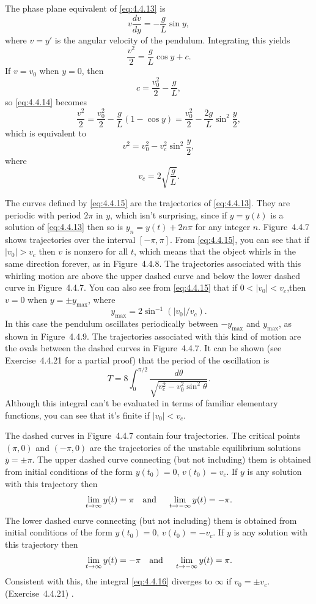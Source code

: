 \begin{example}
  The phase plane equivalent of \eqref{eq:4.4.13} is
  \[
    v\frac{dv}{dy}=-\frac{g}{L}\sin y,
  \]
  where $v=y'$ is the angular velocity of the pendulum. Integrating this yields
  \begin{equation}
    \label{eq:4.4.14}\frac{v^{2}}{2}=\frac{g}{L}\cos y+c.
  \end{equation}
  If $v=v_{0}$ when $y=0$, then
  \[
    c=\frac{v_{0}^{2}}{2}-\frac{g}{L},
  \]
  so \eqref{eq:4.4.14} becomes
  \[
    \frac{v^{2}}{2}=\frac{v_{0}^{2}}{2}-\frac{g}{L}(1-\cos y) =\frac{v_{0}^{2}}{2}-\frac{2g}{L}\sin^{2}\frac{y}{2},
  \]
  which is equivalent to
  \begin{equation}
    \label{eq:4.4.15}v^{2}=v_{0}^{2}-v_{c}^{2}\sin^{2}\frac{y}{2},
  \end{equation}
  where
  \[
    v_{c}=2\sqrt{\frac{g}{L}}.
  \]

  The curves defined by \eqref{eq:4.4.15} are the trajectories of \eqref{eq:4.4.13}. They are
  periodic with period $2\pi$ in $y$, which isn't surprising, since if $y=y(t)$ is a solution of
  \eqref{eq:4.4.13} then so is $y_{n}=y(t)+2n\pi$ for any integer $n$. Figure~4.4.7
  shows trajectories over the interval $[-\pi,\pi]$. From \eqref{eq:4.4.15}, you can see that if
  $|v_{0}|>v_{c}$ then $v$ is nonzero for all $t$, which means that the object whirls in the same
  direction forever, as in Figure~4.4.8. The trajectories associated with this whirling
  motion are above the upper dashed curve and below the lower dashed curve in
  Figure~4.4.7. You can also see from \eqref{eq:4.4.15} that if $0<|v_{0}|<v_{c}$,then
  $v=0$ when $y=\pm y_{\max}$, where
  \[
    y_{\max}=2\sin^{-1}(|v_{0}|/v_{c}).
  \]
  In this case the pendulum oscillates periodically between $-y_{\max}$ and $y_{\max}$, as shown in
  Figure~4.4.9. The trajectories associated with this kind of motion are the ovals
  between the dashed curves in Figure~4.4.7. It can be shown (see
  Exercise~4.4.21 for a partial proof) that the period of the oscillation is
  \begin{equation}
    \label{eq:4.4.16}T=8\int_{0}^{\pi/2}\frac{d\theta}{\sqrt{v_{c}^{2}-v_{0}^{2}\sin^{2}\theta}}.
  \end{equation}
  Although this integral can't be evaluated in terms of familiar elementary functions, you can see
  that it's finite if $|v_{0}|<v_{c}$.

  The dashed curves in Figure~4.4.7 contain four trajectories. The critical points
  $(\pi,0)$ and $(-\pi,0)$ are the trajectories of the unstable equilibrium solutions
  $\overline{y}=\pm\pi$. The upper dashed curve connecting (but not including) them is obtained from
  initial conditions of the form $y(t_{0})=0$, $v(t_{0})=v_{c}$. If $y$ is any solution with this
  trajectory then
  \[
    \lim_{t\to\infty}y(t)=\pi\mbox{\quad and \quad}\lim_{t\to-\infty}y(t)=-\pi.
  \]
  The lower dashed curve connecting (but not including) them is obtained from initial conditions of
  the form $y(t_{0})=0$, $v(t_{0})=-v_{c}$. If $y$ is any solution with this trajectory then
  \[
    \lim_{t\to\infty}y(t)=-\pi\mbox{\quad and \quad}\lim_{t\to-\infty}y(t)=\pi.
  \]
  Consistent with this, the integral \eqref{eq:4.4.16} diverges to $\infty$ if $v_{0}=\pm v_{c}$.
  (Exercise~4.4.21) .


\end{example}

